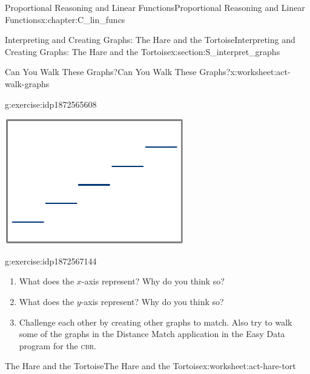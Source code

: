 \documentclass[oneside,10pt,]{book}
\newcommand{\initialism}[1]{\textsc{\MakeLowercase{#1}}}
\numberwithin{equation}{chapter}
\begin{document}
\begin{chapterptx}{Proportional Reasoning and Linear Functions}{}{Proportional Reasoning and Linear Functions}{}{}{x:chapter:C_lin_funcs}
\begin{sectionptx}{Interpreting and Creating Graphs: The Hare and the Tortoise}{}{Interpreting and Creating Graphs: The Hare and the Tortoise}{}{}{x:section:S_interpret_graphs}
\begin{worksheet-subsection}{Can You Walk These Graphs?}{}{Can You Walk These Graphs?}{}{}{x:worksheet:act-walk-graphs}
\begin{divisionexercise}{1}{}{}{g:exercise:idp1872565608}
\begin{enumerate}[font=\bfseries,label=(\alph*),ref=\alph*]
\begin{image}{0.325}{0.35}{0.325}
\includegraphics[width=\linewidth]{external/walk-graphs-8.pdf}
\end{image}%
%
\end{enumerate}
\end{divisionexercise}%
\begin{divisionexercise}{2}{}{}{g:exercise:idp1872567144}%
\begin{enumerate}[font=\bfseries,label=(\alph*),ref=\alph*]
\item{}What does the \(x\)-axis represent? Why do you think so?%
\item{}What does the \(y\)-axis represent? Why do you think so?%
\item{}Challenge each other by creating other graphs to match. Also try to walk some of the graphs in the Distance Match application in the Easy Data program for the \initialism{CBR}.%
\end{enumerate}
\end{divisionexercise}%
\end{worksheet-subsection}
\restoregeometry
%
%
\typeout{************************************************}
\typeout{************************************************}
%
\begin{worksheet-subsection}{The Hare and the Tortoise}{}{The Hare and the Tortoise}{}{}{x:worksheet:act-hare-tort}
\begin{introduction}{}%

\end{introduction}
\end{worksheet-subsection}
\end{sectionptx}
\end{chapterptx}
\end{document}
